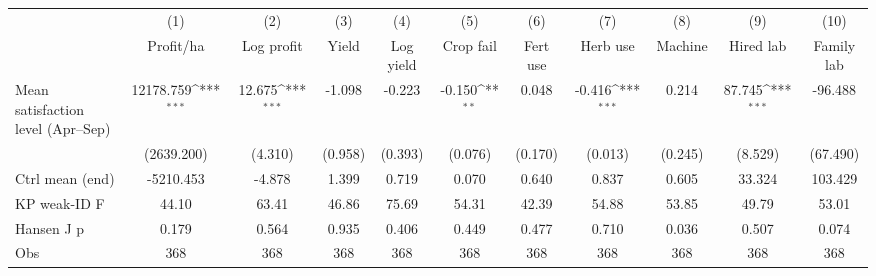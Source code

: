 {
\def\sym#1{\ifmmode^{#1}\else\(^{#1}\)\fi}
\begin{tabular}{l*{10}{c}}
\toprule
                    &\multicolumn{1}{c}{(1)}&\multicolumn{1}{c}{(2)}&\multicolumn{1}{c}{(3)}&\multicolumn{1}{c}{(4)}&\multicolumn{1}{c}{(5)}&\multicolumn{1}{c}{(6)}&\multicolumn{1}{c}{(7)}&\multicolumn{1}{c}{(8)}&\multicolumn{1}{c}{(9)}&\multicolumn{1}{c}{(10)}\\
                    &\multicolumn{1}{c}{Profit/ha}&\multicolumn{1}{c}{Log profit}&\multicolumn{1}{c}{Yield}&\multicolumn{1}{c}{Log yield}&\multicolumn{1}{c}{Crop fail}&\multicolumn{1}{c}{Fert use}&\multicolumn{1}{c}{Herb use}&\multicolumn{1}{c}{Machine}&\multicolumn{1}{c}{Hired lab}&\multicolumn{1}{c}{Family lab}\\
\midrule
Mean satisfaction level (Apr--Sep)&   12178.759\sym{***}&      12.675\sym{***}&      -1.098         &      -0.223         &      -0.150\sym{**} &       0.048         &      -0.416\sym{***}&       0.214         &      87.745\sym{***}&     -96.488         \\
                    &  (2639.200)         &     (4.310)         &     (0.958)         &     (0.393)         &     (0.076)         &     (0.170)         &     (0.013)         &     (0.245)         &     (8.529)         &    (67.490)         \\
\midrule
Ctrl mean (end)     &   -5210.453         &      -4.878         &       1.399         &       0.719         &       0.070         &       0.640         &       0.837         &       0.605         &      33.324         &     103.429         \\
KP weak-ID F        &       44.10         &       63.41         &       46.86         &       75.69         &       54.31         &       42.39         &       54.88         &       53.85         &       49.79         &       53.01         \\
Hansen J p          &       0.179         &       0.564         &       0.935         &       0.406         &       0.449         &       0.477         &       0.710         &       0.036         &       0.507         &       0.074         \\
Obs                 &         368         &         368         &         368         &         368         &         368         &         368         &         368         &         368         &         368         &         368         \\
\bottomrule
\end{tabular}
}
